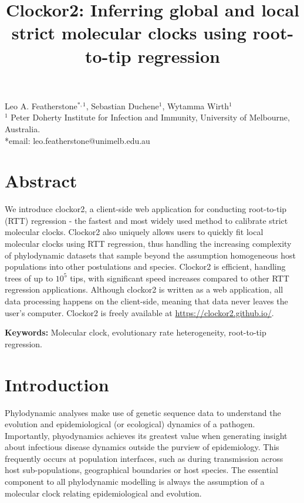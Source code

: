 \documentclass{article}
\title{Clockor2:  Inferring global and local strict molecular clocks using root-to-tip regression}
\begin{document}
\maketitle
\begin{centering}
Leo A. Featherstone$^{\ast,1}$, Sebastian Duchene$^1$, Wytamma Wirth$^{1}$\\
$^{1}$ Peter Doherty Institute for Infection and Immunity, University of Melbourne, Australia.\\
*email: leo.featherstone@unimelb.edu.au
\end{centering}

\section*{Abstract}
We introduce clockor2, a client-side web application for conducting root-to-tip (RTT) regression  - the fastest and most widely used method to calibrate strict molecular clocks. Clockor2 also uniquely allows users to quickly fit local molecular clocks using RTT regression, thus handling the increasing complexity of phylodynamic datasets that sample beyond the assumption homogeneous host populations into other postulations and species. Clockor2 is efficient, handling trees of up to $10^5$ tips, with significant speed increases compared to other RTT regression applications. Although clockor2 is written as a web application, all data processing happens on the client-side, meaning that data never leaves the user's computer. Clockor2 is freely available at \url{https://clockor2.github.io/}.

\textbf{Keywords:} Molecular clock, evolutionary rate heterogeneity, root-to-tip regression.

\section*{Introduction}
Phylodynamic analyses make use of genetic sequence data to understand the evolution and epidemiological (or ecological) dynamics of a pathogen. Importantly, phyodynamics achieves its greatest value when generating insight about infectious disease dynamics outside the purview of epidemiology. This frequently occurs at population interfaces, such as during transmission across host sub-populations,  geographical boundaries or host species. The essential component to all phylodynamic modelling is always the assumption of a molecular clock relating epidemiological and evolution.
\end{document}
